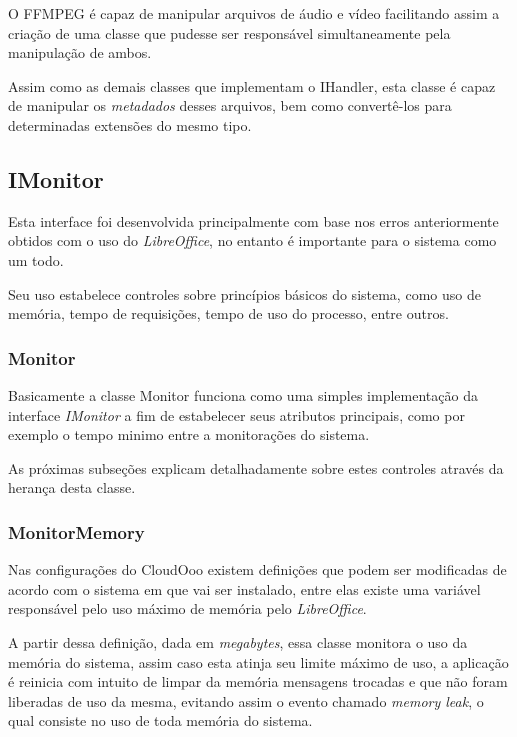 {O FFMPEG  é capaz de manipular arquivos de áudio e vídeo facilitando assim a criação de uma classe que pudesse ser responsável simultaneamente pela manipulação de ambos.

Assim como as demais classes que implementam o IHandler, esta classe é capaz de manipular os \textit{metadados} desses arquivos, bem como convertê-los para determinadas extensões do mesmo tipo.


\subsection{IMonitor}

Esta interface foi desenvolvida principalmente com base nos erros anteriormente obtidos com o uso do \textit{LibreOffice}, no entanto é importante para o sistema como um todo.

Seu uso estabelece controles sobre princípios básicos do sistema, como uso de memória, tempo de requisições, tempo de uso do processo, entre outros.


\subsubsection{Monitor}

Basicamente a classe Monitor funciona como uma simples implementação da interface \textit{IMonitor} a fim de estabelecer seus atributos principais, como por exemplo o tempo minimo entre a monitorações do sistema. 

As próximas subseções explicam detalhadamente sobre estes controles através da herança desta classe.


\subsubsection{MonitorMemory}
\label{monitormem}

Nas configurações do CloudOoo existem definições que podem ser modificadas de acordo com o sistema em que vai ser instalado, entre elas existe uma variável responsável pelo uso máximo de memória pelo \textit{LibreOffice}.

A partir dessa definição, dada em \textit{megabytes}, essa classe monitora o uso da memória do sistema, assim caso esta atinja seu limite máximo de uso, a aplicação é reinicia com intuito de limpar da memória mensagens trocadas e que não foram liberadas de uso da mesma, evitando assim o evento chamado \textit{memory leak}, o qual consiste no uso de toda memória do sistema.


}
